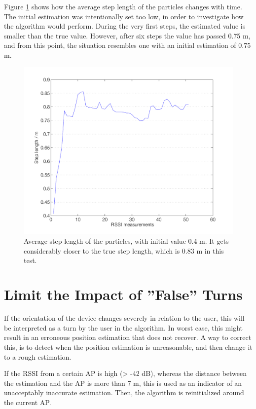 \documentclass{LTHthesis}
\begin{document}
Figure \ref{step_length} shows how the average step length of the particles changes with time. The initial estimation was intentionally set too low, in order to investigate how the algorithm would perform. During the very first steps, the estimated value is smaller than the true value. However, after six steps the value has passed 0.75 m, and from this point, the situation resembles one with an initial estimation of 0.75 m. 
%
\begin{figure}[!hbt]

\includegraphics[width=1\textwidth ]{images/sensor_fused/step_length}
\caption{Average step length of the particles, with initial value 0.4 m. It gets considerably closer to the true step length, which is 0.83 m in this test.}\label{step_length}
\end{figure}
%
\section{Limit the Impact of ''False'' Turns}
%
If the orientation of the device changes severely in relation to the user, this will be interpreted as a turn by the user in the algorithm. In worst case, this might result in an erroneous position estimation that does not recover. A way to correct this, is to detect when the position estimation is unreasonable, and then change it to a rough estimation.

If the RSSI from a certain AP is high (> -42 dB), whereas the distance between the estimation and the AP is more than 7 m, this is used as an indicator of an unacceptably inaccurate estimation. Then, the algorithm is reinitialized around the current AP.
\end{document}
